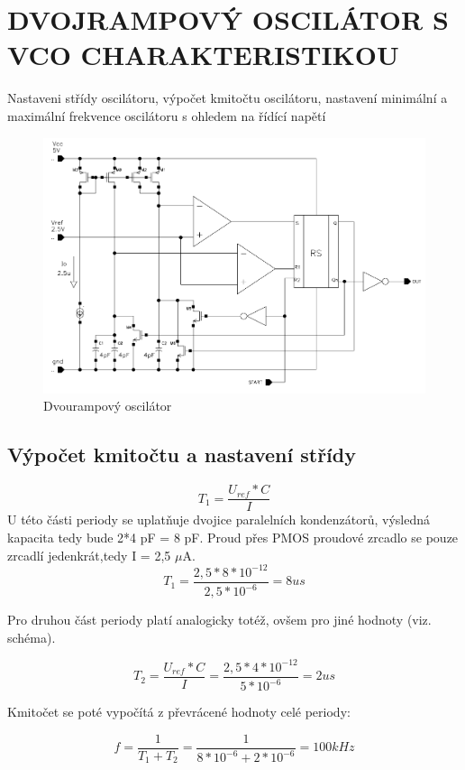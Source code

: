\section{DVOJRAMPOVÝ OSCILÁTOR S VCO CHARAKTERISTIKOU}
Nastaveni střídy oscilátoru, výpočet kmitočtu oscilátoru, nastavení minimální a maximální frekvence oscilátoru s ohledem na řídící napětí

\begin{figure}[h]
   \begin{center}
     \includegraphics[scale=0.4]{images/OSC.png}
   \end{center}
   \caption{Dvourampový oscilátor}
\end{figure}

\subsection{Výpočet kmitočtu a nastavení střídy}

\begin{equation}
T_{1} = \frac{U_{ref}*C}{I}
\end{equation}
U této části periody se uplatňuje dvojice paralelních kondenzátorů, výsledná kapacita tedy bude 2*4 pF = 8 pF. Proud přes PMOS proudové zrcadlo se pouze zrcadlí jedenkrát,tedy I = 2,5 $\mu$A. 
\begin{equation*}
T_{1} = \frac{2,5*8*10^{-12}}{2,5*10^{-6}} = 8 us
\end{equation*}

Pro druhou část periody platí analogicky totéž, ovšem pro jiné hodnoty (viz. schéma).

\begin{equation*}
T_{2} = \frac{U_{ref}*C}{I} = \frac{2,5*4*10^{-12}}{5*10^{-6}} = 2 us
\end{equation*}

Kmitočet se poté vypočítá z převrácené hodnoty celé periody:

\begin{equation*}
f = \frac{1}{T_{1}+T_{2}} =  \frac{1}{8*10^{-6}+2*10^{-6}} = 100 kHz
\end{equation*}
